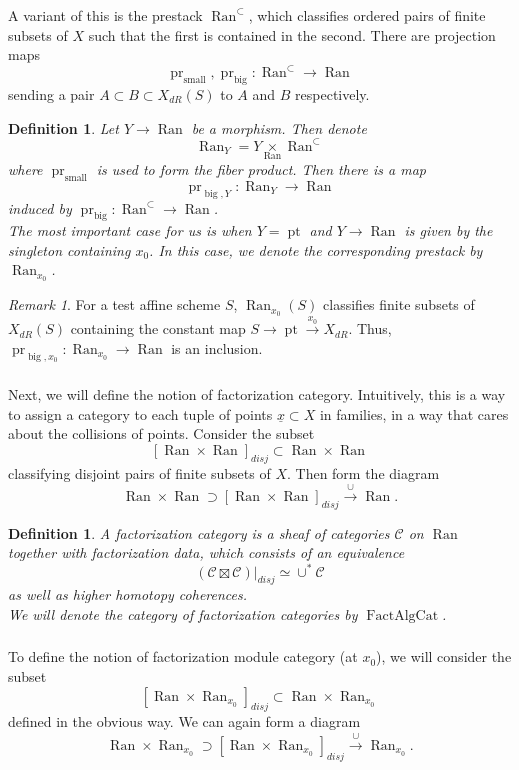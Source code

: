\documentclass[10pt]{amsart}
\newtheorem{defn}[subsubsection]{Definition}
\theoremstyle{remark}
\newtheorem{rem}[subsubsection]{Remark}
\newcommand{\on}[1]{\operatorname{#1}}
\newcommand{\Ran}{\on{Ran}}
\newcommand{\FactAlgCat}{\on{FactAlgCat}}
\newcommand{\sssec}[1]{\subsubsection{}}
\begin{document}
\sssec{}
A variant of this is the prestack $\Ran^{\subset}$, which classifies ordered pairs of finite subsets of $X$ such that the first is contained in the second. There are projection maps
$$
\on{pr}_{\on{small}}, \on{pr}_{\on{big}}: \Ran^{\subset} \longrightarrow \Ran
$$
sending a pair $A \subset B \subset X_{dR}(S)$ to $A$ and $B$ respectively.

\begin{defn}
    Let $Y \to \Ran$ be a morphism. Then denote
    $$
    \Ran_Y = Y \underset{\Ran}{\times} \Ran^{\subset}
    $$
    where $\on{pr}_{\on{small}}$ is used to form the fiber product. Then there is a map
    $$
    \on{pr}_{\on{big}, Y} : \Ran_Y \longrightarrow \Ran
    $$
    induced by $\on{pr}_{\on{big}} : \Ran^{\subset} \to \Ran$.
    \\
    The most important case for us is when $Y = \on{pt}$ and $Y \to \Ran$ is given by the singleton containing $x_0$. In this case, we denote the corresponding prestack by $\Ran_{x_0}$.
\end{defn}

\begin{rem}
    For a test affine scheme $S$, $\Ran_{x_0}(S)$ classifies finite subsets of $X_{dR}(S)$ containing the constant map $S \to \on{pt} \overset{x_0}{\to} X_{dR}$. Thus, $\on{pr}_{\on{big}, x_0} : \Ran_{x_0} \to \Ran$ is an inclusion.
\end{rem}

\sssec{}
Next, we will define the notion of factorization category. Intuitively, this is a way to assign a category to each tuple of points $\underline{x} \subset X$ in families, in a way that cares about the collisions of points. Consider the subset
$$
    [\Ran \times \Ran]_{disj} \subset \Ran \times \Ran
$$
classifying disjoint pairs of finite subsets of $X$. Then form the diagram
$$
\Ran \times \Ran \supset [\Ran \times \Ran]_{disj} \overset{\cup}{\to} \Ran.
$$
\begin{defn}
    A factorization category is a sheaf of categories $\mathcal{C}$ on $\Ran$ together with factorization data, which consists of an equivalence
    $$
        (\mathcal{C} \boxtimes \mathcal{C})|_{disj} \simeq \cup^* \mathcal{C}
    $$
    as well as higher homotopy coherences.
    \\
    We will denote the category of factorization categories by $\FactAlgCat$.
\end{defn}

\sssec{}
To define the notion of factorization module category (at $x_0$), we will consider the subset
$$
    [\Ran \times \Ran_{x_0}]_{disj} \subset \Ran \times \Ran_{x_0}
$$
defined in the obvious way. We can again form a diagram
$$
\Ran \times \Ran_{x_0} \supset [\Ran \times \Ran_{x_0}]_{disj} \overset{\cup}{\to} \Ran_{x_0}.
$$
\end{document}

